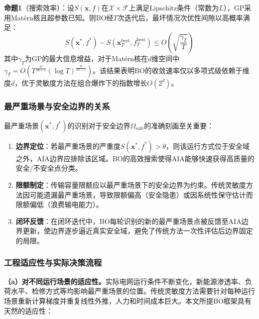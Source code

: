 \documentclass[a4paper,11pt]{ctexart}
\newcommand{\bx}{\mathbf{x}}
\begin{document}
\textbf{命题1}（搜索效率）：设$S(\bx, f)$在$\mathcal{X} \times \mathcal{F}$上满足Lipschitz条件（常数为$L$），GP采用Matérn核且超参数已知。则BO经$T$次迭代后，最坏情况次优性间隙以高概率满足：
\begin{equation}
    S(\bx^*, f^*) - S(\bx_T^{\text{best}}, f_T^{\text{best}}) \leq O\left(\sqrt{\frac{\gamma_T}{T}}\right)
    \label{eq:bo_bound}
\end{equation}
其中$\gamma_T$为GP的最大信息增益，对于Matérn核在$d$维空间中$\gamma_T = O\left(T^{\frac{d}{2d+1}} (\log T)^{\frac{d}{2d+1}}\right)$\cite{srinivas2010gp_ucb, frazier2018bo_tutorial}。该结果表明BO的收敛速率仅以多项式级依赖于维度$d$，优于灵敏度方法在组合爆炸下的指数增长$O(2^d)$。

\subsubsection{最严重场景与安全边界的关系}

最严重场景$(\bx^*, f^*)$的识别对于安全边界$\Omega_{\text{safe}}$的准确刻画至关重要：

\begin{enumerate}
    \item \textbf{边界定位}：若最严重场景的严重度$S(\bx^*, f^*) > \theta$，则该运行方式位于安全域之外，AIA边界应排除该区域。BO的高效搜索使得AIA能够快速获得高质量的安全/不安全点分类。

    \item \textbf{限额制定}：传输容量限额应以最严重场景下的安全边界为约束。传统灵敏度方法因可能遗漏最严重场景，导致限额偏高（安全隐患）或因系统性保守估计而限额偏低（浪费输电能力）。

    \item \textbf{闭环反馈}：在闭环迭代中，BO每轮识别的新的最严重场景点被反馈至AIA边界更新，使边界逐步逼近真实安全域，避免了传统方法一次性评估后边界固定的局限。
\end{enumerate}

\subsubsection{工程适应性与实际决策流程}

\textbf{（a）对不同运行场景的适应性。}实际电网运行条件不断变化，新能源渗透率、负荷水平、检修方式等均影响最严重场景的位置。传统灵敏度方法需要针对每种运行场景重新计算梯度并重复线性外推，人力和时间成本巨大。本文所提BO框架具有天然的适应性：
\end{document}
